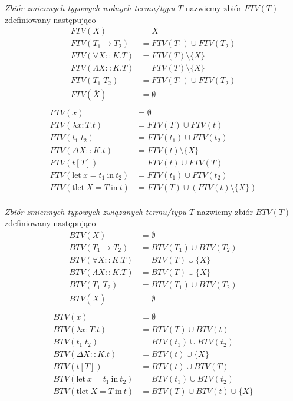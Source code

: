 \documentclass[11pt,leqno]{article}
\begin{document}
\begin{definicja}
\emph{Zbiór zmiennych typowych wolnych termu/typu $T$} nazwiemy zbiór $FTV(T)$ zdefiniowany następująco
\begin{align*}
FTV(X) & = X \\
FTV(T_1 \to T_2) & = FTV(T_1) \cup FTV(T_2) \\
FTV(\forall X :: K . T) & = FTV(T) \setminus \{ X \} \\
FTV(\Lambda X :: K . T) & = FTV(T) \setminus \{ X \} \\
FTV(T_1 \; T_2) & = FTV(T_1) \cup FTV(T_2) \\
FTV(\bar{X}) & = \emptyset \\
\end{align*}
\begin{align*}
FTV(x) & = \emptyset \\
FTV(\lambda x : T.t) & = FTV(T) \cup FTV(t) \\
FTV(t_1 \; t_2) & = FTV(t_1) \cup FTV(t_2) \\
FTV(\Delta X :: K.t) & = FTV(t) \setminus \{ X \} \\
FTV(t[T]) & = FTV(t) \cup FTV(T) \\
FTV(\textrm{let} \ x = t_1 \ \textrm{in} \ t_2) & = FTV(t_1) \cup FTV(t_2) \\
FTV(\textrm{tlet} \ X = T \ \textrm{in} \ t) & = FTV(T) \cup (FTV(t) \setminus \{ X \}) \\
\end{align*}
\end{definicja}

\begin{definicja}
\emph{Zbiór zmiennych typowych związanych termu/typu $T$} nazwiemy zbiór $BTV(T)$ zdefiniowany następująco
\begin{align*}
BTV(X) & = \emptyset \\
BTV(T_1 \to T_2) & = BTV(T_1) \cup BTV(T_2) \\
BTV(\forall X :: K . T) & = BTV(T) \cup \{ X \} \\
BTV(\Lambda X :: K . T) & = BTV(T) \cup \{ X \} \\
BTV(T_1 \; T_2) & = BTV(T_1) \cup BTV(T_2) \\
BTV(\bar{X}) & = \emptyset \\
\end{align*}
\begin{align*}
BTV(x) & = \emptyset \\
BTV(\lambda x : T.t) & = BTV(T) \cup BTV(t) \\
BTV(t_1 \; t_2) & = BTV(t_1) \cup BTV(t_2) \\
BTV(\Delta X :: K.t) & = BTV(t) \cup \{ X \} \\
BTV(t[T]) & = BTV(t) \cup BTV(T) \\
BTV(\textrm{let} \ x = t_1 \ \textrm{in} \ t_2) & = BTV(t_1) \cup BTV(t_2) \\
BTV(\textrm{tlet} \ X = T \ \textrm{in} \ t) & = BTV(T) \cup BTV(t) \cup \{ X \} \\
\end{align*}
\end{definicja}
\end{document}
